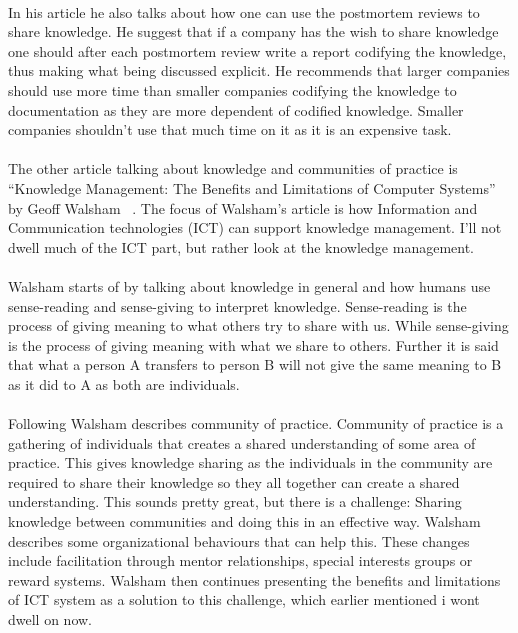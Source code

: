 \documentclass{article}
\begin{document}
\paragraph{}In his article he also talks about how one can use the postmortem reviews to share knowledge. He suggest that if a company has the wish to share knowledge one should after each postmortem review write a report codifying the knowledge, thus making what being discussed explicit. He recommends that larger companies should use more time than smaller companies codifying the knowledge to documentation as they are more dependent of codified knowledge. Smaller companies shouldn't use that much time on it as it is an expensive task.

\paragraph{}The other article talking about knowledge and communities of practice is ``Knowledge Management: The Benefits and Limitations of Computer Systems'' by Geoff Walsham ~\cite{Walsham}. The focus of Walsham's article is how Information and Communication technologies (ICT) can support knowledge management. I'll not dwell much of the ICT part, but rather look at the knowledge management. 

\paragraph{} Walsham starts of by talking about knowledge in general and how humans use sense-reading and sense-giving to interpret knowledge. Sense-reading is the process of giving meaning to what others try to share with us. While sense-giving is the process of giving meaning with what we share to others. Further it is said that what a person A transfers to person B will not give the same meaning to B as it did to A as both are individuals. 

\paragraph{} Following Walsham describes community of practice. Community of practice is a gathering of individuals that creates a shared understanding of some area of practice. This gives knowledge sharing as the individuals in the community are required to share their knowledge so they all together can create a shared understanding. This sounds pretty great, but there is a challenge: Sharing knowledge between communities and doing this in an effective way. Walsham describes some organizational behaviours that can help this. These changes include facilitation through mentor relationships, special interests groups or reward systems. Walsham then continues presenting the benefits and limitations of ICT system as a solution to this challenge, which earlier mentioned i wont dwell on now. 
\end{document}

